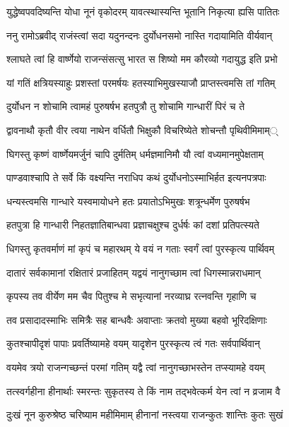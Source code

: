 \twolineshloka
{युद्धेष्वपवदिष्यन्ति योधा नूनं वृकोदरम्}
{यावत्स्थास्यन्ति भूतानि निकृत्या ह्यसि पातितः}


\twolineshloka
{ननु रामोऽब्रवीद् राजंस्त्वां सदा यदुनन्दनः}
{दुर्योधनसमो नास्ति गदायामिति वीर्यवान्}


\twolineshloka
{श्लाघते त्वां हि वार्ष्णेयो राजन्संसत्सु भारत}
{स शिष्यो मम कौरव्यो गदायुद्ध इति प्रभो}


\twolineshloka
{यां गतिं क्षत्रियस्याहुः प्रशस्तां परमर्षयः}
{हतस्याभिमुखस्याजौ प्राप्तस्त्वमसि तां गतिम्}


\twolineshloka
{दुर्योधन न शोचामि त्वामहं पुरुषर्षभ}
{हतपुत्रौ तु शोचामि गान्धारीं पिरं च ते}


\twolineshloka
{द्वावनाथौ कृतौ वीर त्वया नाथेन वर्धितौ}
{भिक्षुकौ विचरिष्येते शोचन्तौ पृथिवीमिमाम््}


\twolineshloka
{घिगस्तु कृष्णं वार्ष्णेयमर्जुनं चापि दुर्मतिम्}
{धर्मज्ञमानिमौ यौ त्वां वध्यमानमुपेक्षताम्}


\twolineshloka
{पाण्डवाश्चापि ते सर्वे किं वक्ष्यन्ति नराधिप}
{कथं दुर्योधनोऽस्माभिर्हत इत्यनपत्रपाः}


\twolineshloka
{धन्यस्त्वमसि गान्धारे यस्वमायोधने हतः}
{प्रयातोऽभिमुखः शत्रून्धर्मेण पुरुषर्षभ}


\twolineshloka
{हतपुत्रा हि गान्धारी निहतज्ञातिबान्धवा}
{प्रज्ञाचक्षुश्च दुर्धर्षः कां दशां प्रतिपत्स्यते}


\twolineshloka
{धिगस्तु कृतवर्माणं मां कृपं च महारथम्}
{ये वयं न गताः स्वर्गं त्वां पुरस्कृत्य पार्थिवम्}


\twolineshloka
{दातारं सर्वकामानां रक्षितारं प्रजाहितम्}
{यद्वयं नानुगच्छाम त्वां धिगस्मान्नराधमान्}


\twolineshloka
{कृपस्य तव वीर्येण मम चैव पितुश्च मे}
{सभृत्यानां नरव्याघ्र रत्नवन्ति गृहाणि च}


\twolineshloka
{तव प्रसादादस्माभिः समित्रैः सह बान्धवैः}
{अवाप्ताः क्रतवो मुख्या बहवो भूरिदक्षिणाः}


\twolineshloka
{कुतश्चापीदृशं पापाः प्रवर्तिष्यामहे वयम्}
{यादृशेन पुरस्कृत्य त्वं गतः सर्वपार्थिवान्}


\threelineshloka
{वयमेव त्रयो राजन्गच्छन्तं परमां गतिम्}
{यद्वै त्वां नानुगच्छाभस्तेन तप्स्यामहे वयम्}
{}


\twolineshloka
{तत्स्वर्गहीना हीनार्थाः स्मरन्तः सुकृतस्य ते}
{किं नाम तद्भवेत्कर्म येन त्वां न व्रजाम वै}


\twolineshloka
{दुःखं नून कुरुश्रेष्ठ चरिष्याम महीमिमाम्}
{हीनानां नस्त्वया राजन्कुतः शान्तिः कुतः सुखं}



